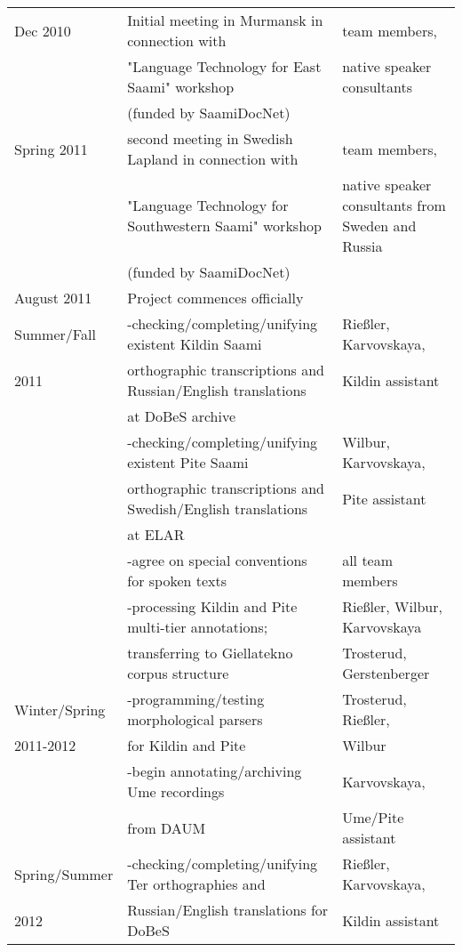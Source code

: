 \documentclass[a4paper,12pt]{article}
\begin{document}
{{{{\begin{longtable}{ l l l }
\hline Dec 2010		& Initial meeting in Murmansk in connection with		& team members,\\
				& "Language Technology for East Saami" workshop		&native speaker consultants\\%
				& (funded by SaamiDocNet) 						& \\
\hline Spring 2011	& second meeting in Swedish Lapland in connection with	& team members,\\
				& "Language Technology for Southwestern Saami" workshop	& native speaker consultants from Sweden and Russia\\
				& (funded by SaamiDocNet)						&\\
\hline August 2011	&Project commences officially						&\\
\hline Summer/Fall	&-checking/completing/unifying existent Kildin Saami		& Rießler, Karvovskaya,\\
	2011			& orthographic transcriptions and Russian/English translations& Kildin assistant\\
				& at DoBeS archive								&\\
				&-checking/completing/unifying existent Pite Saami		& Wilbur, Karvovskaya,\\
				& orthographic transcriptions and Swedish/English translations& Pite assistant\\
				& at ELAR										&\\
				&-agree on special conventions for spoken texts		& all team members\\
				&-processing Kildin and Pite multi-tier annotations;		& Rießler, Wilbur, Karvovskaya\\ %
				&transferring to Giellatekno corpus structure			& Trosterud, Gerstenberger\\
\hline Winter/Spring	&-programming/testing morphological parsers			& Trosterud, Rießler,\\
	2011-2012	&for Kildin and Pite								& Wilbur\\
				&-begin annotating/archiving Ume recordings			& Karvovskaya,\\
				&from DAUM									& Ume/Pite assistant\\
\hline Spring/Summer&-checking/completing/unifying Ter orthographies and	& Rießler, Karvovskaya,\\
	2012			&Russian/English translations for DoBeS				& Kildin assistant\\

\end{longtable}}}}}
\end{document}
